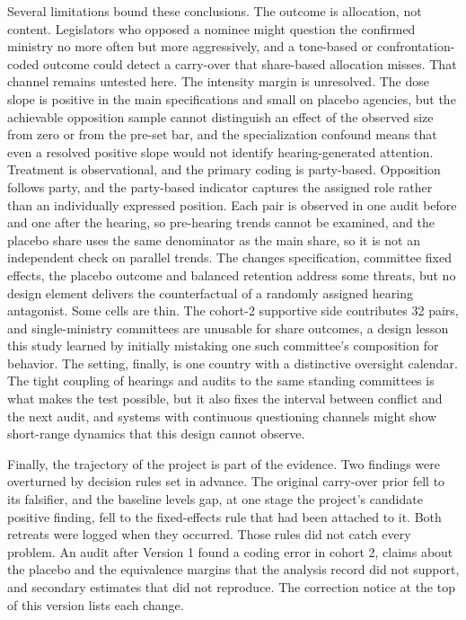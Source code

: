 \documentclass[11pt]{article}
\begin{document}
Several limitations bound these conclusions. The outcome is allocation, not content. Legislators who opposed a nominee might question the confirmed ministry no more often but more aggressively, and a tone-based or confrontation-coded outcome could detect a carry-over that share-based allocation misses. That channel remains untested here. The intensity margin is unresolved. The dose slope is positive in the main specifications and small on placebo agencies, but the achievable opposition sample cannot distinguish an effect of the observed size from zero or from the pre-set bar, and the specialization confound means that even a resolved positive slope would not identify hearing-generated attention. Treatment is observational, and the primary coding is party-based. Opposition follows party, and the party-based indicator captures the assigned role rather than an individually expressed position. Each pair is observed in one audit before and one after the hearing, so pre-hearing trends cannot be examined, and the placebo share uses the same denominator as the main share, so it is not an independent check on parallel trends. The changes specification, committee fixed effects, the placebo outcome and balanced retention address some threats, but no design element delivers the counterfactual of a randomly assigned hearing antagonist. Some cells are thin. The cohort-2 supportive side contributes 32 pairs, and single-ministry committees are unusable for share outcomes, a design lesson this study learned by initially mistaking one such committee's composition for behavior. The setting, finally, is one country with a distinctive oversight calendar. The tight coupling of hearings and audits to the same standing committees is what makes the test possible, but it also fixes the interval between conflict and the next audit, and systems with continuous questioning channels might show short-range dynamics that this design cannot observe.

Finally, the trajectory of the project is part of the evidence. Two findings were overturned by decision rules set in advance. The original carry-over prior fell to its falsifier, and the baseline levels gap, at one stage the project's candidate positive finding, fell to the fixed-effects rule that had been attached to it. Both retreats were logged when they occurred. Those rules did not catch every problem. An audit after Version 1 found a coding error in cohort 2, claims about the placebo and the equivalence margins that the analysis record did not support, and secondary estimates that did not reproduce. The correction notice at the top of this version lists each change.
\end{document}
